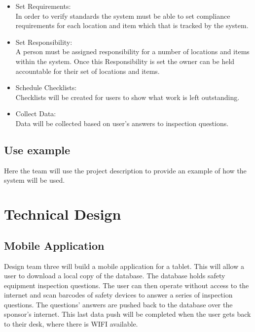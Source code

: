\documentclass[Letter,11pt]{article}
\begin{document}
		\begin{itemize}
			\item Set Requirements:\\
			In order to verify standards the system must be able to set compliance requirements for each location and item which that is tracked by the system.
			\item Set Responsibility:\\
			A person must be assigned responsibility for a number of locations and items within the system. Once this Responsibility is set the owner can be held accountable for their set of locations and items. 
			\item Schedule Checklists:\\
			Checklists will be created for users to show what work is left outstanding.
			\item Collect Data:\\
			Data will be collected based on user's answers to inspection questions. 
		\end{itemize}
		
	\subsection{Use example}
		Here the team will use the project description to provide an example of how the system will be used.

		


\section{Technical Design}

	\subsection{Mobile Application}
	Design team three will build a mobile application for a tablet. This will allow a user to download a local copy of the  database. The database holds safety equipment inspection questions. The user can then operate without access to the internet and scan barcodes of safety devices to answer a series of inspection questions. The questions' answers are pushed back to the database over the sponsor's internet. This last data push will be completed when the user gets back to their desk, where there is WIFI available.
\end{document}
